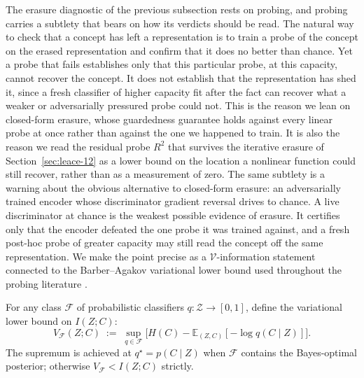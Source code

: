 The erasure diagnostic of the previous subsection rests on probing, and probing
carries a subtlety that bears on how its verdicts should be read. The natural way
to check that a concept has left a representation is to train a probe of the
concept on the erased representation and confirm that it does no better than
chance. Yet a probe that fails establishes only that this particular probe, at
this capacity, cannot recover the concept. It does not establish that the
representation has shed it, since a fresh classifier of higher capacity fit after
the fact can recover what a weaker or adversarially pressured probe could not.
This is the reason we lean on closed-form erasure, whose guardedness guarantee
holds against every linear probe at once rather than against the one we happened
to train. It is also the reason we read the residual probe $R^2$ that survives
the iterative erasure of Section~\ref{sec:leace-12} as a lower bound on the
location a nonlinear function could still recover, rather than as a measurement of
zero. The same subtlety is a warning about the obvious alternative to closed-form
erasure: an adversarially trained encoder whose discriminator gradient reversal
drives to chance. A live discriminator at chance is the weakest possible evidence
of erasure. It certifies only that the encoder defeated the one probe it was
trained against, and a fresh post-hoc probe of greater capacity may still read the
concept off the same representation. We make the point precise as a $\mathcal{V}$-information
\citep{xu2020theory} statement connected to the Barber--Agakov variational lower
bound used throughout the probing literature \citep{pimentel2020information}.

For any class $\mathcal{F}$ of probabilistic classifiers $q: \mathcal{Z} \to [0,1]$, define the variational lower bound on $I(Z; C)$:
\begin{equation}
V_{\mathcal{F}}(Z; C) \;:=\; \sup_{q \in \mathcal{F}} \big[H(C) - \mathbb{E}_{(Z,C)}[-\log q(C \mid Z)]\big].
\end{equation}
The supremum is achieved at $q^\star = p(C \mid Z)$ when $\mathcal{F}$ contains the Bayes-optimal posterior; otherwise $V_{\mathcal{F}} < I(Z; C)$ strictly.

